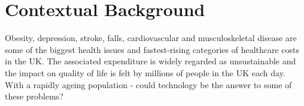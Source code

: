 \chapter{Contextual Background}
\label{chap:context}
%
%
%
%
%

Obesity, depression, stroke, falls, cardiovascular and musculoskeletal disease are some of the biggest health issues and fastest-rising categories of healthcare costs in the UK. The associated expenditure is widely regarded as unsustainable and the impact on quality of life is felt by millions of people in the UK each day. With a rapidly ageing population - could technology be the answer to some of these problems?

